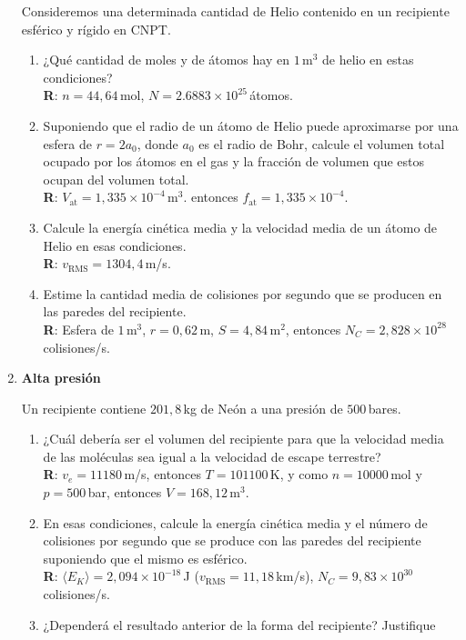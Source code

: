 \documentclass[a4paper,12pt]{article}
\begin{document}
\begin{enumerate}
		Consideremos una determinada cantidad de Helio contenido en un recipiente esférico y rígido en CNPT.
		\begin{enumerate}
			\item ¿Qué cantidad de moles y de átomos hay en $1$\,m$^3$ de
				helio en estas condiciones?
				\\{\bf R}: $n=44,64$\,mol, $N=2.6883\times 10^{25}$\,átomos.
			\item Suponiendo que el radio de un átomo de Helio puede
				aproximarse por una esfera de $r=2 a_0$, donde $a_0$ es el
				radio de Bohr, calcule el volumen total ocupado por los átomos
				en el gas y la fracción de volumen que estos ocupan del volumen
				total. 
				\\{\bf R}: $V_{\mathrm{at}}=1,335\times 10^{-4}$\,m$^3$.
				entonces $f_{\mathrm{at}}=1,335\times 10^{-4}$.
			\item Calcule la energía cinética media y la velocidad media de un átomo de Helio en esas condiciones. 
				\\{\bf R}: $v_{\mathrm{RMS}}=1304,4$\,m/s.
			\item Estime la cantidad media de colisiones por segundo que se producen en las paredes del recipiente. 
				\\{\bf R}: Esfera de $1$\,m$^3$, $r=0,62$\,m, $S=4,84$\,m$^2$, entonces $N_C=2,828 \times 10^{28}$\,colisiones/s.
		\end{enumerate}
	
	\item {\bf{Alta presión}}
	
		Un recipiente contiene $201,8$\,kg de Neón a una presión de $500$\,bares. 
		\begin{enumerate}
			\item ¿Cuál debería ser el volumen del recipiente para que la velocidad media de las moléculas sea igual a la velocidad de escape terrestre? 
				\\{\bf R}: $v_e=11180$\,m/s, entonces $T=101100$\,K, y como $n=10000$\,mol y $p=500$\,bar, entonces $V=168,12$\,m$^3$. 
			\item En esas condiciones, calcule la energía cinética media y el número de colisiones por segundo que se produce con las paredes del recipiente suponiendo que el mismo es esférico. 
				\\{\bf R}: $\langle E_K \rangle = 2,094 \times 10^{-18}$\,J ($v_{\mathrm{RMS}}=11,18$\,km/s), $N_C=9,83 \times 10^{30}$\,colisiones/s.
			\item ¿Dependerá el resultado anterior de la forma del recipiente? Justifique
		\end{enumerate}
\end{enumerate}
\end{document}
